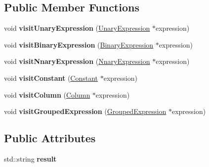 \subsection*{Public Member Functions}
\begin{DoxyCompactItemize}
\item 
\hypertarget{class_writing_expression_visitor_ae9e2e5b8ba44dbde0d8e9461df5add9b}{void {\bfseries visit\+Unary\+Expression} (\hyperlink{class_unary_expression}{Unary\+Expression} $\ast$expression)}\label{class_writing_expression_visitor_ae9e2e5b8ba44dbde0d8e9461df5add9b}

\item 
\hypertarget{class_writing_expression_visitor_ad6302b69c3d050b280d10449eb90ee47}{void {\bfseries visit\+Binary\+Expression} (\hyperlink{class_binary_expression}{Binary\+Expression} $\ast$expression)}\label{class_writing_expression_visitor_ad6302b69c3d050b280d10449eb90ee47}

\item 
\hypertarget{class_writing_expression_visitor_a36c7ec04fda1f4b5435259331669d11a}{void {\bfseries visit\+Nnary\+Expression} (\hyperlink{class_nnary_expression}{Nnary\+Expression} $\ast$expression)}\label{class_writing_expression_visitor_a36c7ec04fda1f4b5435259331669d11a}

\item 
\hypertarget{class_writing_expression_visitor_aff9e80097dbb4d0f08e2052cd7146371}{void {\bfseries visit\+Constant} (\hyperlink{class_constant}{Constant} $\ast$expression)}\label{class_writing_expression_visitor_aff9e80097dbb4d0f08e2052cd7146371}

\item 
\hypertarget{class_writing_expression_visitor_ac2a8314129b6b238a184b3d6f6fa40c0}{void {\bfseries visit\+Column} (\hyperlink{class_column}{Column} $\ast$expression)}\label{class_writing_expression_visitor_ac2a8314129b6b238a184b3d6f6fa40c0}

\item 
\hypertarget{class_writing_expression_visitor_adcd079cbe5995822236c5b9fdb4b0532}{void {\bfseries visit\+Grouped\+Expression} (\hyperlink{class_grouped_expression}{Grouped\+Expression} $\ast$expression)}\label{class_writing_expression_visitor_adcd079cbe5995822236c5b9fdb4b0532}

\end{DoxyCompactItemize}
\subsection*{Public Attributes}
\begin{DoxyCompactItemize}
\item 
\hypertarget{class_writing_expression_visitor_a2aa14a9c85538776cf147ed5ff6a27e9}{std\+::string {\bfseries result}}\label{class_writing_expression_visitor_a2aa14a9c85538776cf147ed5ff6a27e9}

\end{DoxyCompactItemize}


